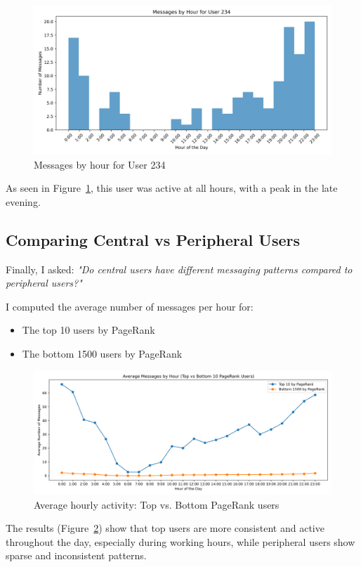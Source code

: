 \begin{figure}[H]
    \centering
    \includegraphics[width=\linewidth]{../Images/user_234_messages_by_hour.png}
    \caption{Messages by hour for User 234}
    \label{fig:user234-hourly}
\end{figure}

As seen in Figure~\ref{fig:user234-hourly}, this user was active at all hours, with a peak in the late evening.

\subsection{Comparing Central vs Peripheral Users}

Finally, I asked: \textit{"Do central users have different messaging patterns compared to peripheral users?"}

I computed the average number of messages per hour for:

\begin{itemize}
    \item The top 10 users by PageRank
    \item The bottom 1500 users by PageRank
\end{itemize}

\begin{figure}[H]
    \centering
    \includegraphics[width=\linewidth]{../Images/average_messages_by_hour_top_bottom.png}
    \caption{Average hourly activity: Top vs. Bottom PageRank users}
    \label{fig:top-vs-bottom}
\end{figure}

The results (Figure~\ref{fig:top-vs-bottom}) show that top users are more consistent and active throughout the day, especially during working hours, while peripheral users show sparse and inconsistent patterns.

